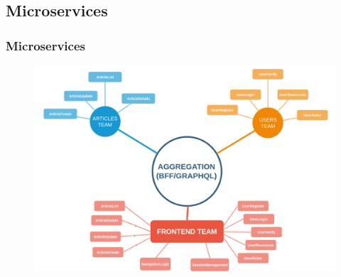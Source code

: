 \subsection{Microservices}

\begin{frame}
\frametitle{Microservices}
	\begin{figure}
		\centering
		\includegraphics[width=0.8\linewidth]{pictures/microservices-knowledge.png}		
		\label{fig:microservices}
	\end{figure}
\end{frame}


